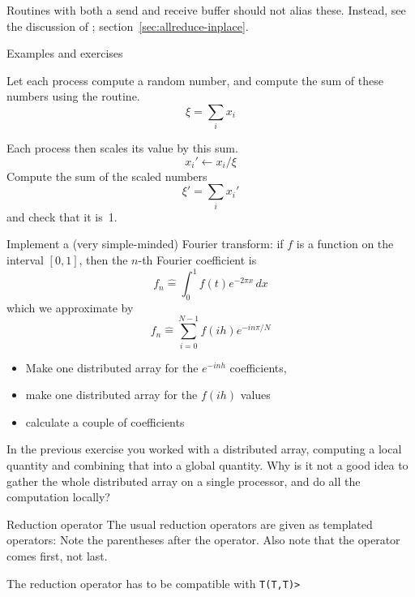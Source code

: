 \begin{remark}
  Routines with both a send and receive buffer should not alias these.
  Instead, see the discussion of ;
  section~\ref{sec:allreduce-inplace}.
\end{remark}

 {Examples and exercises}

\begin{exercise}
  \label{ex:randommaxscale}
  Let each process compute a random number,
  and compute the sum of these numbers using the 
  routine.
  \[ \xi = \sum_i x_i \]

  Each process then scales its value
  by this sum.
  \[ x_i' \leftarrow x_i/ \xi \]
  Compute the sum of the scaled numbers
  \[ \xi' = \sum_i x_i' \]
  and check that it is~1.
\end{exercise}

\begin{exercise}
  \label{ex:fft-vector}
  Implement a (very simple-minded) Fourier transform: if $f$ is a
  function on the interval $[0,1]$, then the $n$-th Fourier
  coefficient is
  \[ f_n\hat = \int_0^1 f(t)e^{-2\pi x}\,dx \]
  which we approximate by
  \[ f_n\hat = \sum_{i=0}^{N-1} f(ih)e^{-in\pi/N} \]
  \begin{itemize}
  \item Make one distributed array for the $e^{-inh}$ coefficients,
  \item make one distributed array for the $f(ih)$ values
  \item calculate a couple of coefficients
  \end{itemize}
\end{exercise}

\begin{exercise}
  In the previous exercise you worked with a distributed array,
  computing a local quantity and combining that into a global
  quantity.
  Why is it not a good idea to gather the whole distributed array on a
  single processor, and do all the computation locally?
\end{exercise}

\begin{mplnote}{Reduction operator}
  The usual reduction operators are given as templated operators:
  Note the parentheses after the operator.
  Also note that the operator comes first, not last.
  \begin{mplimpl}
    The reduction operator has to be compatible with
    \lstinline+T(T,T)>+
  \end{mplimpl}
\end{mplnote}

